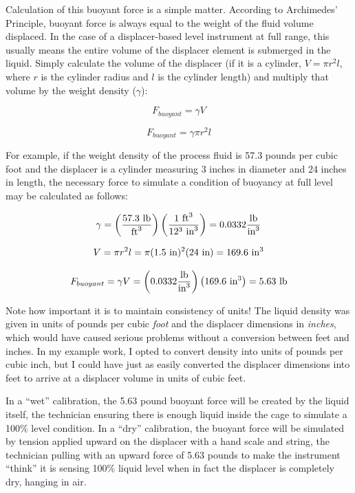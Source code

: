 Calculation of this buoyant force is a simple matter.  According to Archimedes' Principle, buoyant force is always equal to the weight of the fluid volume displaced.  In the case of a displacer-based level instrument at full range, this usually means the entire volume of the displacer element is submerged in the liquid.  Simply calculate the volume of the displacer (if it is a cylinder, $V = \pi r^2 l$, where $r$ is the cylinder radius and $l$ is the cylinder length) and multiply that volume by the weight density ($\gamma$):    

$$F_{buoyant} = \gamma V$$

$$F_{buoyant} = \gamma \pi r^2 l$$

\filbreak

For example, if the weight density of the process fluid is 57.3 pounds per cubic foot and the displacer is a cylinder measuring 3 inches in diameter and 24 inches in length, the necessary force to simulate a condition of buoyancy at full level may be calculated as follows:

$$\gamma = \left(\hbox{57.3 lb} \over \hbox{ft}^3 \right) \left(\hbox{1 ft}^3 \over 12^3 \hbox{ in}^3 \right) = 0.0332 {\hbox{lb} \over \hbox{in}^3}$$

$$V = \pi r^2 l = \pi (1.5 \hbox{ in})^2 (24 \hbox{ in}) = 169.6 \hbox{ in}^3$$

$$F_{buoyant} = \gamma V =  \left( 0.0332 {\hbox{lb} \over \hbox{in}^3}\right) \left(  169.6 \hbox{ in}^3\right) = 5.63 \hbox{ lb}$$

Note how important it is to maintain consistency of units!  The liquid density was given in units of pounds per cubic \textit{foot} and the displacer dimensions in \textit{inches}, which would have caused serious problems without a conversion between feet and inches.  In my example work, I opted to convert density into units of pounds per cubic inch, but I could have just as easily converted the displacer dimensions into feet to arrive at a displacer volume in units of cubic feet.

In a ``wet'' calibration, the 5.63 pound buoyant force will be created by the liquid itself, the technician ensuring there is enough liquid inside the cage to simulate a 100\% level condition.  In a ``dry'' calibration, the buoyant force will be simulated by tension applied upward on the displacer with a hand scale and string, the technician pulling with an upward force of 5.63 pounds to make the instrument ``think'' it is sensing 100\% liquid level when in fact the displacer is completely dry, hanging in air.






